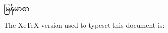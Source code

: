 \documentclass{article}
\begin{document}



မြန်မာစာ

The XeTeX version used to typeset this document is:
\the\XeTeXversion\XeTeXrevision
\end{document}
